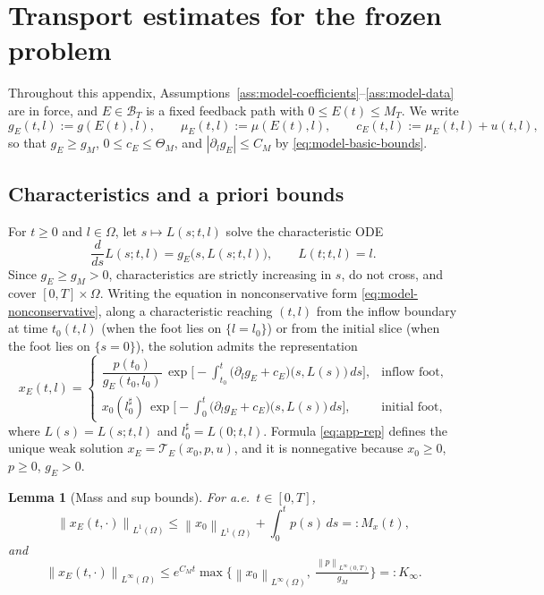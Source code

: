 \documentclass[pdflatex,sn-mathphys-num]{sn-jnl}
\theoremstyle{thmstyleone}
\newtheorem{lemma}[theorem]{Lemma}
\theoremstyle{definition}
\theoremstyle{remark}
\newcommand{\Om}{\Omega}
\newcommand{\Tcal}{\mathcal{T}}
\newcommand{\Bt}{\mathcal{B}_T}
\newcommand{\norm}[1]{\left\lVert#1\right\rVert}
\newcommand{\abs}[1]{\left\lvert#1\right\rvert}
\numberwithin{equation}{section}
\begin{document}
\appendix
\section{Transport estimates for the frozen problem}
\label{app:transport}
Throughout this appendix, Assumptions~\ref{ass:model-coefficients}--\ref{ass:model-data}
are in force, and $E\in\Bt$ is a fixed feedback path with $0\le E(t)\le M_T$. We
write
\[
g_E(t,l):=g(E(t),l),\qquad
\mu_E(t,l):=\mu(E(t),l),\qquad
c_E(t,l):=\mu_E(t,l)+u(t,l),
\]
so that $g_E\ge g_M$, $0\le c_E\le\Theta_M$, and $\abs{\partial_l g_E}\le C_M$ by
\eqref{eq:model-basic-bounds}.

\subsection{Characteristics and a priori bounds}
\label{subsec:app-characteristics}

For $t\ge0$ and $l\in\Om$, let $s\mapsto L(s;t,l)$ solve the characteristic ODE
\begin{equation}
\label{eq:app-char}
\frac{d}{ds}L(s;t,l)=g_E\big(s,L(s;t,l)\big),
\qquad
L(t;t,l)=l .
\end{equation}
Since $g_E\ge g_M>0$, characteristics are strictly increasing in $s$, do not
cross, and cover $[0,T]\times\Om$. Writing the equation in nonconservative form
\eqref{eq:model-nonconservative}, along a characteristic reaching $(t,l)$ from the
inflow boundary at time $t_0(t,l)$ (when the foot lies on $\{l=l_0\}$) or from the
initial slice (when the foot lies on $\{s=0\}$), the solution admits the
representation
\begin{equation}
\label{eq:app-rep}
x_E(t,l)=
\begin{cases}
\dfrac{p(t_0)}{g_E(t_0,l_0)}\,
\exp\!\Big[-\displaystyle\int_{t_0}^{t}
\big(\partial_l g_E+c_E\big)\!\big(s,L(s)\big)\,ds\Big],
& \text{inflow foot},\\[1.6em]
x_0(l_0^\sharp)\,
\exp\!\Big[-\displaystyle\int_{0}^{t}
\big(\partial_l g_E+c_E\big)\!\big(s,L(s)\big)\,ds\Big],
& \text{initial foot},
\end{cases}
\end{equation}
where $L(s)=L(s;t,l)$ and $l_0^\sharp=L(0;t,l)$. Formula \eqref{eq:app-rep}
defines the unique weak solution $x_E=\Tcal_E(x_0,p,u)$, and it is nonnegative
because $x_0\ge0$, $p\ge0$, $g_E>0$.

\begin{lemma}[Mass and sup bounds]
\label{lem:app-mass-sup}
For a.e.\ $t\in[0,T]$,
\begin{equation}
\label{eq:app-L1}
\norm{x_E(t,\cdot)}_{L^1(\Om)}\le \norm{x_0}_{L^1(\Om)}+\int_0^t p(s)\,ds
=:M_x(t),
\end{equation}
and
\begin{equation}
\label{eq:app-Linf}
\norm{x_E(t,\cdot)}_{L^\infty(\Om)}\le
e^{C_M t}\max\Big\{\norm{x_0}_{L^\infty(\Om)},\
\tfrac{\norm{p}_{L^\infty(0,T)}}{g_M}\Big\}=:K_\infty .
\end{equation}
\end{lemma}
\end{document}
